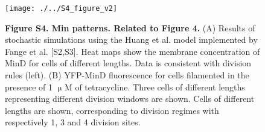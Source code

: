 \documentclass[]{article}
\begin{document}
\newpage

\begin{figure}
	\centering
	\texttt{[image: ./../S4\_figure\_v2]}
	\caption*{
		\textbf{Figure S4. Min patterns. Related to Figure 4.} 
		(A) Results of stochastic simulations using the Huang et al. model implemented by Fange et al. [S2,S3]. Heat maps show the membrane concentration of MinD for cells of different lengths. Data is consistent with division rules (left). (B) YFP-MinD fluorescence for cells filamented in the presence of 1 $\upmu$M of tetracycline. Three cells of different lengths representing different division windows are shown. Cells of different lengths are shown, corresponding to division regimes with respectively 1, 3 and 4 division sites. 
	}	
\end{figure}	

\clearpage
\end{document}
